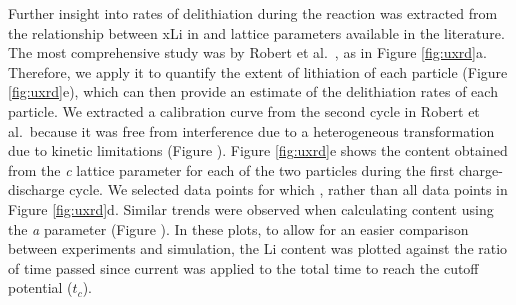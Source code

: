 \documentclass{article}
\begin{document}
Further insight into rates of delithiation during the reaction was
extracted from the relationship between \gls{xLi} in  and
lattice parameters available in the literature. The most comprehensive
study was by Robert et al\cite{robert2015}.\ , as in Figure
\ref{fig:uxrd}a. Therefore, we apply it to quantify the extent of
lithiation of each particle (Figure \ref{fig:uxrd}e), which can then
provide an estimate of the delithiation rates of each particle. We
extracted a calibration curve from the second cycle in Robert et
al\cite{robert2015}.\ because it was free from interference due to a
heterogeneous transformation due to kinetic limitations (Figure
). Figure \ref{fig:uxrd}e shows the 
content obtained from the \emph{c} lattice parameter for each of the
two  particles during the first charge-discharge cycle. We
selected data points for which ,
rather than all data points in Figure \ref{fig:uxrd}d. Similar trends
were observed when calculating  content using the \emph{a}
parameter (Figure ). In these plots, to allow for
an easier comparison between experiments and simulation, the Li
content was plotted against the ratio of time passed since current was
applied to the total time to reach the cutoff potential ($t_c$).
\end{document}
